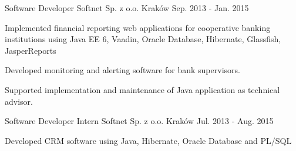 \begin{cventries}
  \cventry
    {Software Developer} %
    {Softnet Sp. z o.o.} %
    {Kraków} %
    {Sep. 2013 - Jan. 2015} %
    {
      \begin{cvitems} %
       \item {Implemented financial reporting web applications for cooperative banking institutions using Java EE 6, Vaadin, Oracle Database, Hibernate, Glassfish, JasperReports}
	  \item {Developed monitoring and alerting software for bank supervisors.} 
	  \item {Supported implementation and maintenance of Java application as technical advisor.}
      \end{cvitems}
    }
  \cventry
    {Software Developer Intern} %
    {Softnet Sp. z o.o.} %
    {Kraków} %
    {Jul. 2013 - Aug. 2015} %
    {
      \begin{cvitems} %
       \item {Developed CRM software using Java, Hibernate, Oracle Database and PL/SQL}
      \end{cvitems}
    }
\end{cventries}
